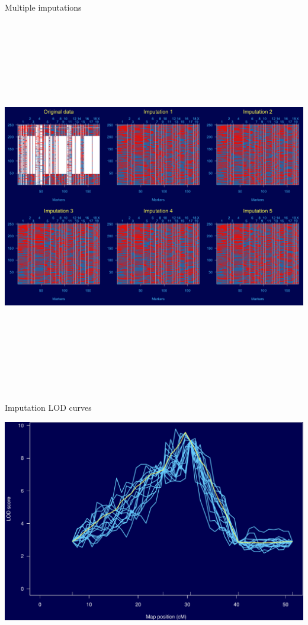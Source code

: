 \documentclass[12pt]{article}
\newcommand{\headsize}{\fontsize{35}{35} \selectfont}
\begin{document}
\headsize \color{myyellow}
\hfill \begin{minipage}{5.75in}
\centering
Multiple imputations
\end{minipage}

\vfill

\centerline{\includegraphics[height=6.5in]{Figs/multiimp.png}}



\newpage

\headsize \color{myyellow}
\hfill \begin{minipage}{5.75in}
\centering
Imputation LOD curves
\end{minipage}

\vfill

\centerline{\includegraphics{Figs/imp_lod.pdf}}
\end{document}
